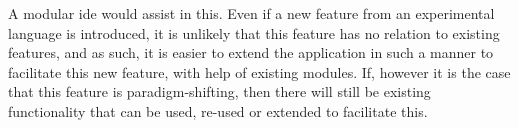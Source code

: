A modular \gls{ide} would assist in this. Even if a new feature from an
experimental language is introduced, it is unlikely that this feature has no
relation to existing features, and as such, it is easier to extend the
application in such a manner to facilitate this new feature, with help of
existing modules.
If, however it is the case that this feature is paradigm-shifting, then there
will still be existing functionality that can be used, re-used or extended to
facilitate this.
